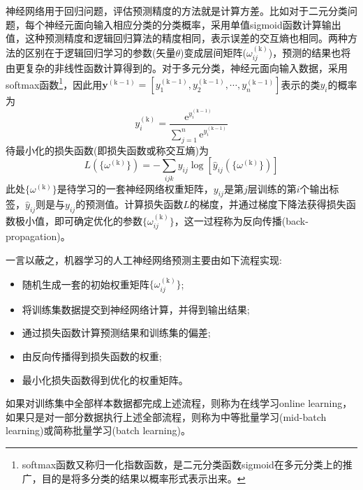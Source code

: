 神经网络用于回归问题，评估预测精度的方法就是计算方差。比如对于二元分类问题，每个神经元面向输入相应分类的分类概率，采用单值\textrm{sigmoid}函数计算输出值，这种预测精度和逻辑回归算法的精度相同，表示误差的交互熵也相同。两种方法的区别在于逻辑回归学习的参数(矢量$\theta$)变成层间矩阵($\omega_{ij}^{(\mathrm{k})}$)，预测的结果也将由更复杂的非线性函数计算得到的。对于多元分类，神经元面向输入数据，采用\textrm{softmax}函数\footnote{\textrm{softmax}函数又称归一化指数函数，是二元分类函数\textrm{sigmoid}在多元分类上的推广，目的是将多分类的结果以概率形式表示出来。}，因此用$\mathbf{y}^{(\mathrm{k}-1)}=[y_1^{(\mathrm{k}-1)},y_2^{(\mathrm{k}-1)},\cdots,y_n^{(\mathrm{k}-1)}]$表示的类$y_i$的概率为
\begin{displaymath}
	y_i^{(\mathrm{k})}=\dfrac{\mathrm{e}^{y_i^{(\mathrm{k}-1)}}}{\sum\limits_{j=1}^n\mathrm{e}^{y_i^{(\mathrm{k}-1)}}}
\end{displaymath}
待最小化的损失函数(即损失函数或称交互熵)为
\begin{displaymath}
	L(\{\omega^{(\mathrm{k})}\})=-\sum_{ijk}y_{ij}\log[\hat{y}_{ij}(\{\omega^{(\mathrm{k})}\})]
\end{displaymath}
此处$\{\omega^{(\mathrm{k})}\}$是待学习的一套神经网络权重矩阵，$y_{ij}$是第$j$层训练的第$i$个输出标签，$\hat{y}_{ij}$则是与$y_{ij}$的预测值。计算损失函数$L$的梯度，并通过梯度下降法获得损失函数极小值，即可确定优化的参数$\{\omega_{ij}^{(\mathrm{k})}\}$，这一过程称为反向传播\textrm{(back-propagation)}。

一言以蔽之，机器学习的人工神经网络预测主要由如下流程实现:
\begin{itemize}
	\item 随机生成一套的初始权重矩阵$\{\omega_{ij}^{(\mathrm{k})}\}$;
	\item 将训练集数据提交到神经网络计算，并得到输出结果;
	\item 通过损失函数计算预测结果和训练集的偏差;
	\item 由反向传播得到损失函数的权重;
	\item 最小化损失函数得到优化的权重矩阵。
\end{itemize}
如果对训练集中全部样本数据都完成上述流程，则称为在线学习\textrm{online learning}，如果只是对一部分数据执行上述全部流程，则称为中等批量学习\textrm{(mid-batch learning)}或简称批量学习\textrm{(batch learning)}。

